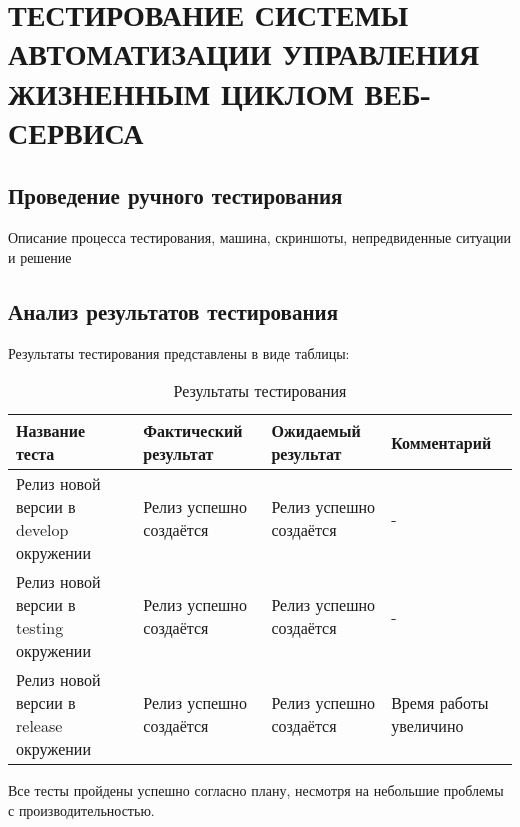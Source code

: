 \chapter{ТЕСТИРОВАНИЕ СИСТЕМЫ АВТОМАТИЗАЦИИ УПРАВЛЕНИЯ ЖИЗНЕННЫМ ЦИКЛОМ ВЕБ-СЕРВИСА}
\label{cha:research}

\section{Проведение ручного тестирования}

Описание процесса тестирования, машина, скриншоты, непредвиденные ситуации и решение \cite{devOpsPhy}

\section{Анализ результатов тестирования}

Результаты тестирования представлены в виде таблицы:

\begin{center}
    \begin{longtable}{|p{}|p{}|p{}|p{}|}
        \caption{Результаты тестирования}
        \label{tab:testing-res}
        \hline
        Название теста & Фактический результат & Ожидаемый результат & Комментарий \\
        \hline
        Релиз новой версии в develop окружении & Релиз успешно создаётся & Релиз успешно создаётся & - \\
        \hline
        Релиз новой версии в testing окружении & Релиз успешно создаётся & Релиз успешно создаётся & - \\
        \hline
        Релиз новой версии в release окружении & Релиз успешно создаётся & Релиз успешно создаётся & Время работы увеличино \\
        \hline
    \end{longtable}
\end{center}

Все тесты пройдены успешно согласно плану, несмотря на небольшие проблемы с производительностью.


